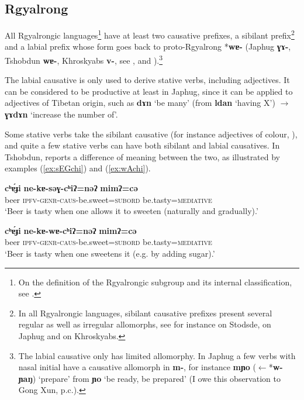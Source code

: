 \documentclass[oneside,a4paper,11pt]{article}
\newcommand{\ipa}[1]{\textbf{{\phon\mbox{#1}}}} %
\newcommand{\forme}[2]{\ipa{#1} `#2'}
\newcommand{\refb}[1]{(\ref{#1})}
\begin{document}
\subsection{Rgyalrong}
All Rgyalrongic languages\footnote{On the definition of the Rgyalrongic subgroup and its internal classification, see \citet{jackson00sidaba, jackson00puxi, jacques14esquisse, lai15person}.} have at least two causative prefixes, a sibilant prefix\footnote{In all Rgyalrongic languages, sibilant causative prefixes present several regular as well as irregular allomorphs, see for instance \citet{jackson07shangzhai} on Stodsde, \citet{jacques15causative} on Japhug and \citet{lai16caus} on Khroskyabs.} and a labial prefix whose form goes back to proto-Rgyalrong *\ipa{wɐ-} (Japhug \ipa{ɣɤ-}, Tshobdun \ipa{wɐ-}, Khroskyabs \ipa{v-}, see \citealt[322]{jacques04these}, \citealt{jackson06paisheng} and \citealt[136]{lai13affixale}).\footnote{The labial causative only has limited allomorphy. In Japhug a few verbs with nasal initial have a causative allomorph in \ipa{m-}, for instance \ipa{mɲo} ($\leftarrow$*\ipa{w-ɲaŋ}) `prepare' from \forme{ɲo}{be ready, be prepared} (I owe this observation to Gong Xun, p.c.).}

The labial causative is only used to derive stative verbs, including adjectives. It can be considered to be  productive at least in Japhug, since it can be applied to adjectives of Tibetan origin, such as \forme{dɤn}{be many} (from \forme{ldan}{having X}) $\rightarrow$ \forme{ɣɤdɤn}{increase the number of}.

Some stative verbs take the sibilant causative (for instance adjectives of colour, \citealt[183]{jacques15causative}), and quite a few stative verbs can have both sibilant and labial causatives. In Tshobdun, \citet{jackson06paisheng, jackson14morpho} reports a difference of meaning between the two, as illustrated by examples \refb{ex:sEGchi} and \refb{ex:wAchi}.

\begin{exe}
\ex \label{ex:sEGchi}
\gll \ipa{cʰɐ́ɟi}	\ipa{ne-kɐ-səɣ-cʰiʔ=nəʔ}	\ipa{mimʔ=cə} \\
beer \textsc{ipfv-genr-caus}-be.sweet=\textsc{subord} be.tasty=\textsc{mediative} \\
\glt `Beer is tasty when one allows it to sweeten (naturally and gradually).'
\end{exe}

 \begin{exe}
\ex \label{ex:wAchi}
\gll \ipa{cʰɐ́ɟi}	\ipa{ne-kɐ-wɐ-cʰiʔ=nəʔ}	\ipa{mimʔ=cə} \\
beer \textsc{ipfv-genr-caus}-be.sweet=\textsc{subord} be.tasty=\textsc{mediative} \\
\glt `Beer is tasty when one sweetens it (e.g. by adding sugar).'
\end{exe}
\end{document}
